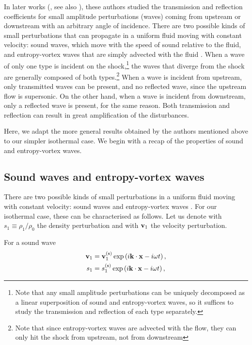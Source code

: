 \documentclass[useAMS,usenatbib]{mn2e}
\begin{document}
In later works (\citealt{Dyakov58a,Dyakov58b,Kontorovich58b}, see also \citealt{McKenzieWestphal1968}), these authors studied the transmission and reflection coefficients for small amplitude perturbations (waves) coming from upstream or downstream with an arbitrary angle of incidence. There are two possible kinds of small perturbations that can propagate in a uniform fluid moving with constant velocity: sound waves, which move with the speed of sound relative to the fluid, and entropy-vortex waves that are simply advected with the fluid \citep[see for example  in][]{landau}. When a wave of only one type is incident on the shock,\footnote{Note that any small amplitude perturbations can be uniquely decomposed as a linear superposition of sound and entropy-vortex waves, so it suffices to study the transmission and reflection of each type separately.} the waves that diverge from the shock are generally composed of both types.\footnote{Note that since entropy-vortex waves are advected with the flow, they can only hit the shock from upstream, not from downstream} When a wave is incident from upstream, only transmitted waves can be present, and no reflected wave, since the upstream flow is supersonic. On the other hand, when a wave is incident from downstream, only a reflected wave is present, for the same reason. Both transmission and reflection can result in great amplification of the disturbances. 

Here, we adapt the more general results obtained by the authors mentioned above to our simpler isothermal case. We begin with a recap of the properties of sound and entropy-vortex waves.
%
\subsection{Sound waves and entropy-vortex waves}
%
There are two possible kinds of small perturbations in a uniform fluid moving with constant velocity: sound waves and entropy-vortex waves . For our isothermal case, these can be characterised as follows. Let us denote with $s_1\equiv \rho_1/\rho_0$ the density perturbation and with $\mathbf{v}_1$ the velocity perturbation. 

For a sound wave
%
\begin{align}
\mathbf{v}_1& = \mathbf{v}_1 ^{(\rm s)} \exp\left( i \mathbf{k} \cdot \mathbf{x} - i \omega t \right), \label{eq:sound1} \\
s_1    &= s_1 ^{(\rm s)} \exp\left( i \mathbf{k} \cdot \mathbf{x} - i \omega t \right), \label{eq:sound2}
\end{align}
\end{document}
